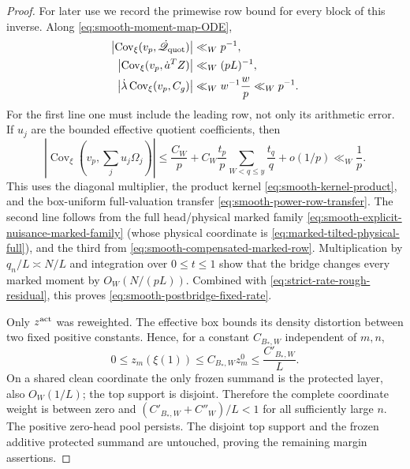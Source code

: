 \documentclass[11pt]{article}
\numberwithin{equation}{section}
\theoremstyle{definition}
\theoremstyle{remark}
\newcommand{\1}{\mathbf 1}
\begin{document}
\begin{proof}
For later use we record the primewise row bound for every block of this
inverse.  Along \eqref{eq:smooth-moment-map-ODE},
\begin{align}
 \left|\operatorname{Cov}_\xi(v_p,\dot{\mathscr Q}_{\rm quot})\right|
   &\ll_Wp^{-1},\notag\\
 \left|\operatorname{Cov}_\xi(v_p,\dot a^TZ)\right|
   &\ll_W(pL)^{-1},\notag\\
 \left|\dot\lambda\operatorname{Cov}_\xi(v_p,C_g)\right|
   &\ll_Ww^{-1}\frac wp\ll_Wp^{-1}.
 \label{eq:smooth-each-block-prime-row}
\end{align}
For the first line one must include the leading row, not only its
arithmetic error.  If \(u_j\) are the bounded effective quotient
coefficients, then
\[
 \left|\operatorname{Cov}_\xi\left(
 v_p,\sum_ju_j\Omega_j\right)\right|
 \le\frac{C_W}{p}
   +C_W\frac{t_p}{p}\sum_{W<q\le y}\frac{t_q}{q}
   +o(1/p)
 \ll_W\frac1p.
\]
This uses the diagonal multiplier, the product kernel
\eqref{eq:smooth-kernel-product}, and the box-uniform full-valuation
transfer \eqref{eq:smooth-power-row-transfer}.
The second line follows from the full head/physical marked family
\eqref{eq:smooth-explicit-nuisance-marked-family} (whose physical
coordinate is \eqref{eq:marked-tilted-physical-full}), and the third from
\eqref{eq:smooth-compensated-marked-row}.  Multiplication by
\(q_n/L\asymp N/L\) and integration over \(0\leq t\leq1\) show that the
bridge changes every marked moment by
\(O_W(N/(pL))\).  Combined with
\eqref{eq:strict-rate-rough-residual}, this proves
\eqref{eq:smooth-postbridge-fixed-rate}.

Only \(z^{\rm act}\) was reweighted.  The effective box bounds its density
distortion between two fixed positive constants.  Hence, for a constant
\(C_{B_*,W}\) independent of \(m,n\),
\begin{equation}
 0\leq z_m(\xi(1))\leq C_{B_*,W}z_m^0
       \leq\frac{C'_{B_*,W}}L.
 \label{eq:smooth-final-active-coordinate-bound}
\end{equation}
On a shared clean coordinate the only frozen summand is the protected
layer, also \(O_W(1/L)\); the top support is disjoint.  Therefore the
complete coordinate weight is between zero and
\((C'_{B_*,W}+C''_W)/L<1\) for all sufficiently large \(n\).  The
positive zero-head pool persists.
The disjoint top support and the frozen additive protected summand are
untouched, proving the remaining margin assertions.
\end{proof}
\end{document}
